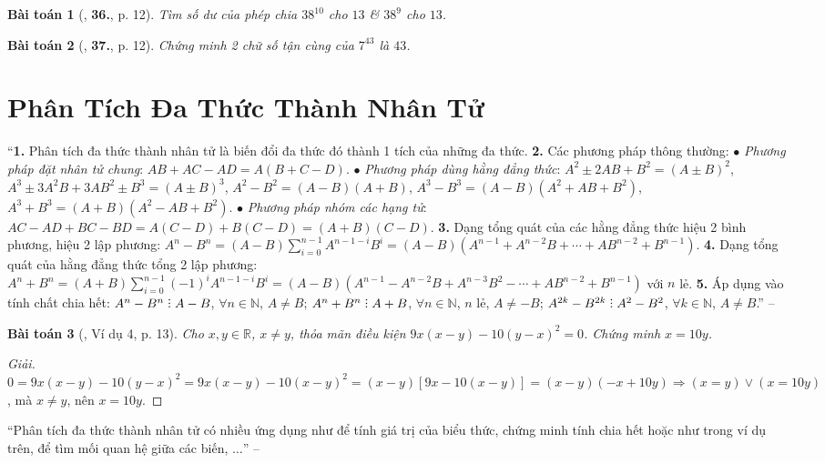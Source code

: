 \documentclass{article}
\numberwithin{equation}{section}
\newtheorem{baitoan}{Bài toán}
\DeclareRobustCommand{\divby}{%
	\mathrel{\vbox{\baselineskip.65ex\lineskiplimit0pt\hbox{.}\hbox{.}\hbox{.}}}%
}
\begin{document}
\begin{baitoan}[\cite{Tuyen_Toan_8}, \textbf{36.}, p. 12]
	Tìm số dư của phép chia $38^{10}$ cho $13$ \& $38^9$ cho $13$.
\end{baitoan}

\begin{baitoan}[\cite{Tuyen_Toan_8}, \textbf{37.}, p. 12]
	Chứng minh 2 chữ số tận cùng của $7^{43}$ là $43$.
\end{baitoan}


\section{Phân Tích Đa Thức Thành Nhân Tử}
``\textbf{1.} Phân tích đa thức thành nhân tử là biến đổi đa thức đó thành 1 tích của những đa thức. \textbf{2.} Các phương pháp thông thường: $\bullet$ \textit{Phương pháp đặt nhân tử chung}: $AB + AC - AD = A(B + C - D)$. $\bullet$ \textit{Phương pháp dùng hằng đẳng thức}: $A^2\pm2AB + B^2 = (A\pm B)^2$, $A^3\pm3A^2B + 3AB^2\pm B^3 = (A\pm B)^3$, $A^2 - B^2 = (A - B)(A + B)$, $A^3 - B^3 = (A - B)(A^2 + AB + B^2)$, $A^3 + B^3 = (A + B)(A^2 - AB + B^2)$. $\bullet$ \textit{Phương pháp nhóm các hạng tử}: $AC - AD + BC - BD = A(C - D) + B(C - D) = (A + B)(C - D)$. \textbf{3.} Dạng tổng quát của các hằng đẳng thức hiệu 2 bình phương, hiệu 2 lập phương: $A^n - B^n = (A - B)\sum_{i=0}^{n-1} A^{n - 1 - i}B^i = (A - B)(A^{n-1} + A^{n-2}B + \cdots + AB^{n-2} + B^{n-1})$. \textbf{4.} Dạng tổng quát của hằng đẳng thức tổng 2 lập phương: $A^n + B^n = (A + B)\sum_{i=0}^{n-1} (-1)^iA^{n - 1 - i}B^i = (A - B)(A^{n-1} - A^{n-2}B + A^{n-3}B^2 - \cdots + AB^{n-2} + B^{n-1})$ với $n$ lẻ. \textbf{5.} Áp dụng vào tính chất chia hết: $A^n - B^n\divby A - B$, $\forall n\in\mathbb{N}$, $A\ne B$; $A^n + B^n\divby A + B$, $\forall n\in\mathbb{N}$, $n$ lẻ, $A\ne-B$; $A^{2k} - B^{2k}\divby A^2 - B^2$, $\forall k\in\mathbb{N}$, $A\ne B$.'' -- \cite[\S3, pp. 12--13]{Tuyen_Toan_8}

\begin{baitoan}[\cite{Tuyen_Toan_8}, Ví dụ 4, p. 13]
	Cho $x,y\in\mathbb{R}$, $x\ne y$, thỏa mãn điều kiện $9x(x - y) - 10(y - x)^2 = 0$. Chứng minh $x = 10y$.
\end{baitoan}

\begin{proof}[Giải]
	$0 = 9x(x - y) - 10(y - x)^2 = 9x(x - y) - 10(x - y)^2 = (x - y)[9x - 10(x - y)] = (x - y)(-x + 10y)\Rightarrow(x = y)\lor(x = 10y)$, mà $x\ne y$, nên $x = 10y$.
\end{proof}
``Phân tích đa thức thành nhân tử có nhiều ứng dụng như để tính giá trị của biểu thức, chứng minh tính chia hết hoặc như trong ví dụ trên, để tìm mối quan hệ giữa các biến, $\ldots$'' -- \cite[p. 14]{Tuyen_Toan_8}
\end{document}
